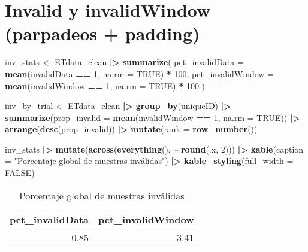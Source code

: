 \documentclass[
]{article}
\newenvironment{Shaded}{\begin{snugshade}}{\end{snugshade}}
\newcommand{\AttributeTok}[1]{\textcolor[rgb]{0.13,0.29,0.53}{#1}}
\newcommand{\ConstantTok}[1]{\textcolor[rgb]{0.56,0.35,0.01}{#1}}
\newcommand{\DecValTok}[1]{\textcolor[rgb]{0.00,0.00,0.81}{#1}}
\newcommand{\FunctionTok}[1]{\textcolor[rgb]{0.13,0.29,0.53}{\textbf{#1}}}
\newcommand{\NormalTok}[1]{#1}
\newcommand{\OtherTok}[1]{\textcolor[rgb]{0.56,0.35,0.01}{#1}}
\newcommand{\SpecialCharTok}[1]{\textcolor[rgb]{0.81,0.36,0.00}{\textbf{#1}}}
\newcommand{\StringTok}[1]{\textcolor[rgb]{0.31,0.60,0.02}{#1}}
\begin{document}
\section{Invalid y invalidWindow (parpadeos +
padding)}\label{invalid-y-invalidwindow-parpadeos-padding}

\begin{Shaded}
\begin{Highlighting}[]
\NormalTok{inv\_stats }\OtherTok{\textless{}{-}}\NormalTok{ ETdata\_clean }\SpecialCharTok{|\textgreater{}}
  \FunctionTok{summarize}\NormalTok{(}
    \AttributeTok{pct\_invalidData   =} \FunctionTok{mean}\NormalTok{(invalidData }\SpecialCharTok{==} \DecValTok{1}\NormalTok{, }\AttributeTok{na.rm =} \ConstantTok{TRUE}\NormalTok{) }\SpecialCharTok{*} \DecValTok{100}\NormalTok{,}
    \AttributeTok{pct\_invalidWindow =} \FunctionTok{mean}\NormalTok{(invalidWindow }\SpecialCharTok{==} \DecValTok{1}\NormalTok{, }\AttributeTok{na.rm =} \ConstantTok{TRUE}\NormalTok{) }\SpecialCharTok{*} \DecValTok{100}
\NormalTok{  )}

\NormalTok{inv\_by\_trial }\OtherTok{\textless{}{-}}\NormalTok{ ETdata\_clean }\SpecialCharTok{|\textgreater{}}
  \FunctionTok{group\_by}\NormalTok{(uniqueID) }\SpecialCharTok{|\textgreater{}}
  \FunctionTok{summarize}\NormalTok{(}\AttributeTok{prop\_invalid =} \FunctionTok{mean}\NormalTok{(invalidWindow }\SpecialCharTok{==} \DecValTok{1}\NormalTok{, }\AttributeTok{na.rm =} \ConstantTok{TRUE}\NormalTok{)) }\SpecialCharTok{|\textgreater{}}
  \FunctionTok{arrange}\NormalTok{(}\FunctionTok{desc}\NormalTok{(prop\_invalid)) }\SpecialCharTok{|\textgreater{}}
  \FunctionTok{mutate}\NormalTok{(}\AttributeTok{rank =} \FunctionTok{row\_number}\NormalTok{())}

\NormalTok{inv\_stats }\SpecialCharTok{|\textgreater{}}
  \FunctionTok{mutate}\NormalTok{(}\FunctionTok{across}\NormalTok{(}\FunctionTok{everything}\NormalTok{(), }\SpecialCharTok{\textasciitilde{}} \FunctionTok{round}\NormalTok{(.x, }\DecValTok{2}\NormalTok{))) }\SpecialCharTok{|\textgreater{}}
  \FunctionTok{kable}\NormalTok{(}\AttributeTok{caption =} \StringTok{"Porcentaje global de muestras inválidas"}\NormalTok{) }\SpecialCharTok{|\textgreater{}}
  \FunctionTok{kable\_styling}\NormalTok{(}\AttributeTok{full\_width =} \ConstantTok{FALSE}\NormalTok{)}
\end{Highlighting}
\end{Shaded}

\begin{longtable}[t]{rr}
\caption{\label{tab:unnamed-chunk-6}Porcentaje global de muestras inválidas}\\
\toprule
pct\_invalidData & pct\_invalidWindow\\
\midrule
0.85 & 3.41\\
\bottomrule
\end{longtable}
\end{document}
